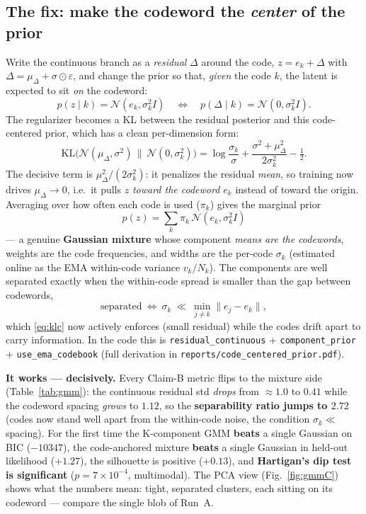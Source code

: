 \documentclass[11pt]{article}
\begin{document}
\subsection*{The fix: make the codeword the \emph{center} of the prior}
Write the continuous branch as a \emph{residual} $\Delta$ around the code, $z=e_k+\Delta$ with
$\Delta=\mu_\Delta+\sigma\odot\varepsilon$, and change the prior so that, \emph{given} the
code $k$, the latent is expected to sit \emph{on} the codeword:
\begin{equation}
p(z\mid k)=\mathcal{N}(e_k,\sigma_k^2 I)
\quad\Longleftrightarrow\quad
p(\Delta\mid k)=\mathcal{N}(0,\sigma_k^2 I).
\end{equation}
The regularizer becomes a KL between the residual posterior and this code-centered prior,
which has a clean per-dimension form:
\begin{equation}
\mathrm{KL}\!\big(\mathcal{N}(\mu_\Delta,\sigma^2)\,\|\,\mathcal{N}(0,\sigma_k^2)\big)
=\log\frac{\sigma_k}{\sigma}+\frac{\sigma^2+\mu_\Delta^2}{2\sigma_k^2}-\tfrac12 .
\label{eq:klc}
\end{equation}
The decisive term is $\mu_\Delta^2/(2\sigma_k^2)$: it penalizes the residual \emph{mean}, so
training now drives $\mu_\Delta\to 0$, i.e.\ it pulls $z$ \emph{toward the codeword $e_k$}
instead of toward the origin. Averaging over how often each code is used ($\pi_k$) gives the
marginal prior
\begin{equation}
\boxed{\,p(z)=\sum_k \pi_k\,\mathcal{N}(e_k,\sigma_k^2 I)\,}
\end{equation}
--- a genuine \textbf{Gaussian mixture} whose component \emph{means are the codewords}, weights
are the code frequencies, and widths are the per-code $\sigma_k$ (estimated online as the EMA
within-code variance $v_k/N_k$). The components are well separated exactly when the within-code
spread is smaller than the gap between codewords,
\begin{equation}
\text{separated}\ \Longleftrightarrow\ \sigma_k\ \ll\ \min_{j\neq k}\lVert e_j-e_k\rVert ,
\label{eq:sepc}
\end{equation}
which \eqref{eq:klc} now actively enforces (small residual) while the codes drift apart to carry
information. In the code this is \texttt{residual\_continuous} + \texttt{component\_prior} +
\texttt{use\_ema\_codebook} (full derivation in \texttt{reports/code\_centered\_prior.pdf}).

\textbf{It works --- decisively.} Every Claim-B metric flips to the mixture side
(Table~\ref{tab:gmm}): the continuous residual std \emph{drops} from $\approx\!1.0$ to $0.41$
while the codeword spacing \emph{grows} to $1.12$, so the \textbf{separability ratio jumps to
$2.72$} (codes now stand well apart from the within-code noise, the condition $\sigma_k\ll$
spacing). For the first time the K-component GMM \textbf{beats} a single Gaussian on BIC
($-10347$), the code-anchored mixture \textbf{beats} a single Gaussian in held-out likelihood
($+1.27$), the silhouette is positive ($+0.13$), and \textbf{Hartigan's dip test is significant}
($p=7\times10^{-4}$, multimodal). The PCA view (Fig.~\ref{fig:gmmC}) shows what the numbers mean:
tight, separated clusters, each sitting on its codeword --- compare the single blob of Run~A.
\end{document}

